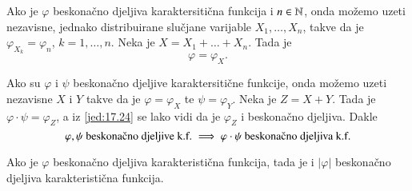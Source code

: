 Ako je $\varphi$ beskona\v cno djeljiva karaktersiti\v cna funkcija i $n \in \mathbb{N}$, onda mo\v zemo uzeti nezavisne, jednako distribuirane slu\v cjane varijable $X_1, \ldots, X_n$, takve da je $\varphi_{X_k} = \varphi_n$, $k = 1, \ldots, n$.
Neka je $X = X_1 + \ldots + X_n$.
Tada je
\begin{equation}    \label{jed:17.24}
    \varphi = \varphi_X.
\end{equation}

Ako su $\varphi$ i $\psi$ beskona\v cno djeljive karaktersiti\v cne funkcije, onda mo\v zemo uzeti nezavisne $X$ i $Y$ takve da je $\varphi = \varphi_X$ te $\psi = \varphi_Y$.
Neka je $Z = X + Y$.
Tada je $\varphi \cdot \psi = \varphi_Z$, a iz \eqref{jed:17.24} se lako vidi da je $\varphi_Z$ i beskona\v cno djeljiva.
Dakle
\begin{equation}    \label{jed:17.25}
    \varphi, \psi \textnormal{ beskona\v cno djeljive k.f.} \implies \varphi \cdot \psi \textnormal{ beskona\v cno djeljiva k.f.}
\end{equation}

\begin{zad} \label{zad:17.26}
    Ako je $\varphi$ beskona\v cno djeljiva karakteristi\v cna funkcija, tada je i $|\varphi|$ beskona\v cno djeljiva karakteristi\v cna funkcija.
\end{zad}